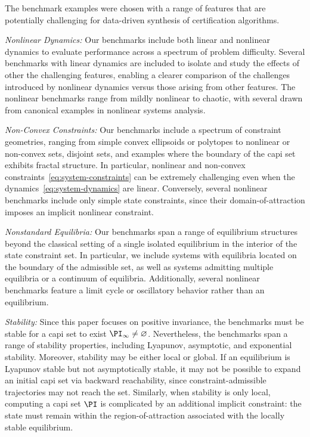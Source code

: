 The benchmark examples were chosen with a range of features that are potentially challenging for data-driven synthesis of certification algorithms.

\emph{Nonlinear Dynamics:}
Our benchmarks include both linear and nonlinear dynamics to evaluate performance across a spectrum of problem difficulty. 
Several benchmarks with linear dynamics are included to isolate and study the effects of other the challenging features, enabling a clearer comparison of the challenges introduced by nonlinear dynamics versus those arising from other features. 
The nonlinear benchmarks range from mildly nonlinear to chaotic, with several drawn from canonical examples in nonlinear systems analysis.

\emph{Non-Convex Constraints:}
Our benchmarks include a spectrum of constraint geometries, ranging from simple convex ellipsoids or polytopes to nonlinear or non-convex sets, disjoint sets, and examples where the boundary of the \ac{capi} set exhibits fractal structure. 
In particular, nonlinear and non-convex constraints~\eqref{eq:system-constraints} can be extremely challenging even when the dynamics~\eqref{eq:system-dynamics} are linear. 
Conversely, several nonlinear benchmarks include only simple state constraints, since their domain-of-attraction imposes an implicit nonlinear constraint.

\emph{Nonstandard Equilibria:}
Our benchmarks span a range of equilibrium structures beyond the classical setting of a single isolated equilibrium in the interior of the state constraint set. 
In particular, we include systems with equilibria located on the boundary of the admissible set, as well as systems admitting multiple equilibria or a continuum of equilibria. Additionally, several nonlinear benchmarks feature a limit cycle or oscillatory behavior rather than an equilibrium. 

\emph{Stability:}
Since this paper focuses on positive invariance, the benchmarks must be stable for a \ac{capi} set to exist $\PI_\infty \neq \varnothing$. Nevertheless, the benchmarks span a range of stability properties, including Lyapunov, asymptotic, and exponential stability.  Moreover, stability may be either local or global. If an equilibrium is Lyapunov stable but not asymptotically stable, it may not be possible to expand an initial \ac{capi} set via backward reachability, since constraint-admissible trajectories may not reach the set. Similarly, when stability is only local, computing a \ac{capi} set $\PI$ is complicated by an additional implicit constraint: the state must remain within the region-of-attraction associated with the locally stable equilibrium.


